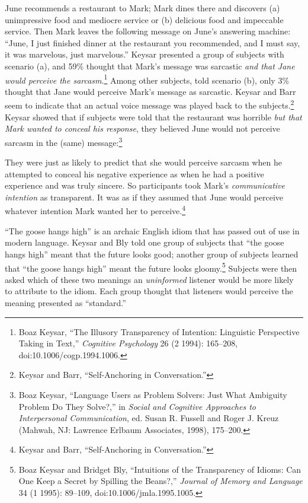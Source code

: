{
 June recommends a restaurant to Mark; Mark dines there and
discovers (a) unimpressive food and mediocre service or (b) delicious
food and impeccable service. Then Mark leaves the following message on
June's answering machine: ``June, I
just finished dinner at the restaurant you recommended, and I must say,
it was marvelous, just marvelous.'' Keysar presented
a group of subjects with scenario (a), and 59\% thought that
Mark's message was sarcastic \textit{and that Jane
would perceive the sarcasm}.\footnote{Boaz Keysar, ``The Illusory Transparency of
Intention: Linguistic Perspective Taking in Text,''
\textit{Cognitive Psychology} 26 (2 1994): 165--208,
doi:10.1006/cogp.1994.1006.} Among other subjects,
told scenario (b), only 3\% thought that Jane would perceive
Mark's message as sarcastic. Keysar and Barr seem to
indicate that an actual voice message was played back to the
subjects.\footnote{Keysar and Barr, ``Self-Anchoring in
Conversation.''} Keysar showed that if subjects were told
that the restaurant was horrible \textit{but that Mark wanted to
conceal his response}, they believed June would not perceive sarcasm in
the (same) message:\footnote{Boaz Keysar, ``Language Users as Problem
Solvers: Just What Ambiguity Problem Do They
Solve?,'' in \textit{Social and Cognitive Approaches
to Interpersonal Communication}, ed. Susan R. Fussell and Roger J.
Kreuz (Mahwah, NJ: Lawrence Erlbaum Associates, 1998), 175--200.}}

{
 They were just as likely to predict that she would perceive
sarcasm when he attempted to conceal his negative experience as when he
had a positive experience and was truly sincere. So participants took
Mark's \textit{communicative intention} as transparent.
It was as if they assumed that June would perceive whatever intention
Mark wanted her to perceive.\footnote{Keysar and Barr, ``Self-Anchoring in
Conversation.''}}

{
 ``The goose hangs high'' is an
archaic English idiom that has passed out of use in modern language.
Keysar and Bly told one group of subjects that ``the
goose hangs high'' meant that the future looks good;
another group of subjects learned that ``the goose
hangs high'' meant the future looks
gloomy.\footnote{Boaz Keysar and Bridget Bly, ``Intuitions of
the Transparency of Idioms: Can One Keep a Secret by Spilling the
Beans?,'' \textit{Journal of Memory and Language} 34
(1 1995): 89--109, doi:10.1006/jmla.1995.1005.} Subjects were then asked which of these two
meanings an \textit{uninformed} listener would be more likely to
attribute to the idiom. Each group thought that listeners would
perceive the meaning presented as
``standard.''}

